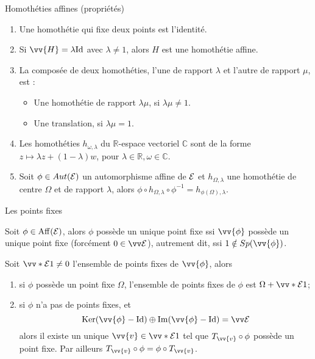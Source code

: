 \documentclass[bigger]{m53beamer}
\begin{document}
  \begin{frame}{Homothéties affines (propriétés)}
    \begin{enumerate}[<+(1)->]
      \item Une homothétie qui fixe deux points est l'identité.
      \item Si $\vv{H}=\lambda\id$ avec $\lambda\neq1$, alors $H$ est une homothétie affine.
      \item La composée de deux homothéties, l'une de rapport $\lambda$ et l'autre de rapport $\mu$, est :
      \begin{itemize}[<+(1)->]
        \item Une homothétie de rapport $\lambda\mu$, si $\lambda\mu \neq 1$.
        \item Une translation, si $\lambda\mu=1$.
      \end{itemize}
      \item Les homothéties $h_{\omega,\lambda}$ du $\mathbb{R}$-espace vectoriel $\mathbb{C}$ sont de la forme $z \mapsto \lambda z + (1-\lambda)w$, pour $\lambda \in \mathbb{R}, \omega \in \mathbb{C}$.
      \item Soit $\phi \in Aut(\mathcal{E})$ un automorphisme affine de $\mathcal{E}$ et $h_{\Omega,\lambda}$ une homothétie de centre $\Omega$ et de rapport $\lambda$, alors $\phi\circ h_{\Omega,\lambda}\circ\phi^{-1}=h_{\phi(\Omega),\lambda}$.
    \end{enumerate}
  \end{frame}
  \begin{frame}{Les points fixes}
    \begin{proposition}
      Soit $\phi\in\operatorname{Aff}(\mathcal{E})$, alors $\phi$ possède un unique point fixe ssi $\vv{\phi}$ possède un unique point fixe (forcément $0\in\ev{E}$)\pause, autrement dit, ssi $1 \notin Sp(\vv{\phi})$.
    \end{proposition}\pause
    \begin{proposition}
      Soit $\vv*{\ens{E}}{1} \neq 0$ l'ensemble de points fixes de $\vv{\phi}$, alors
      \begin{enumerate}[<+(1)->]
        \item si $\phi$ possède un point fixe $\Omega$, l'ensemble de points fixes de $\phi$ est $\Omega+\vv*{\ens{E}}{1}$;
        \item si $\phi$ n'a pas de points fixes\pause, et
          $$
            \ker(\vv{\phi}-\id) \oplus \im(\vv{\phi}-\id) = \ev{E}
          $$\pause
        alors il existe un unique $\vv{v}\in\vv*{\ens{E}}{1}$ tel que $T_{\vv{v}}\circ\phi$ possède un point fixe.\newline\pause
        Par ailleurs $T_{\vv{v}}\circ\phi=\phi\circ T_{\vv{v}}$.
      \end{enumerate}
    \end{proposition}
  \end{frame}
\end{document}
